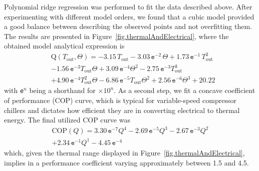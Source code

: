 Polynomial ridge regression was performed to fit the data described above. After experimenting with different model orders, we found that a cubic model provided a good balance between describing the observed points and not overfitting them. The results are presented in Figure~\ref{fig.thermalAndElectrical}, where the obtained model analytical expression is
\begin{align}
	&\text{Q}(T_\text{out},\Theta) = -3.15 \, T_\text{out} - 3.03 \,\texttt{e}^{-2} \, \Theta + 1.73\,\texttt{e}^{-1} \, T_\text{out}^2 \nonumber \\
	&- 1.56\,\texttt{e}^{-3} T_\text{out} \Theta + 3.09\,\texttt{e}^{-4} \Theta^2 - 2.75\,\texttt{e}^{-3} T_\text{out}^3 \label{eq.thermalEnergy} \\
	&+ 4.90 \,\texttt{e}^{-4} T_\text{out}^2 \Theta - 6.86 \,\texttt{e}^{-5} T_\text{out} \Theta^2 + 2.56 \,\texttt{e}^{-6}\Theta^3 + 20.22 \nonumber
\end{align}
with \texttt{e}$^{n}$ being a shorthand for $\times10^{n}$.  As a second step, we fit a concave coefficient of performance (COP) curve, which is typical for variable-speed compressor chillers and dictates how efficient they are in converting electrical to thermal energy. The final utilized COP curve was
\begin{equation}
	\begin{split}
		\text{COP}(Q) = 3.30 \, \texttt{e}^{-7} Q^4 - 2.69 \, \texttt{e}^{-5} Q^3 - 2.67 \, \texttt{e}^{-3} Q^2 \\ + 2.34 \, \texttt{e}^{-1} Q^1 - 4.45 \, \texttt{e}^{-4}
		\label{eq.COP}
	\end{split}
\end{equation}
which, given the thermal range displayed in Figure~\ref{fig.thermalAndElectrical}, implies in a performance coefficient varying approximately between 1.5 and 4.5.

